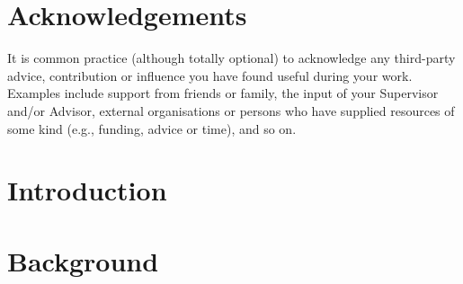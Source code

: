 \documentclass[
author={Riley Evans},
supervisor={Dr. Meng Wang},
degree={MEng},
title={\vbox{Circuit: A Domain Specific Language for Dataflow Programming}},
subtitle={},
type={research},
year={2021}
]{dissertation}
\begin{document}
  

\maketitle


\frontmatter
\makedecl{}
\tableofcontents
\listoftodos







\chapter*{Acknowledgements}

\noindent
It is common practice (although totally optional) to acknowledge any
third-party advice, contribution or influence you have found useful
during your work.  Examples include support from friends or family, 
the input of your Supervisor and/or Advisor, external organisations 
or persons who  have supplied resources of some kind (e.g., funding, 
advice or time), and so on.


\mainmatter{}


\chapter{Introduction}\label{chap:intro}


\chapter{Background}\label{chap:background}
\end{document}
